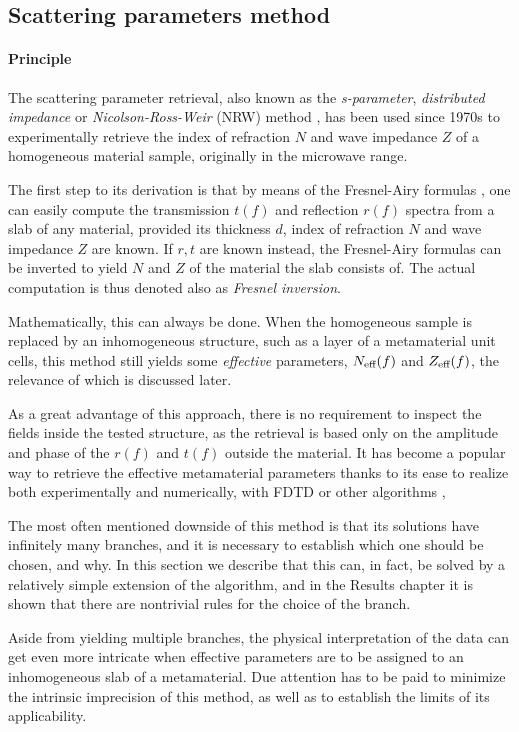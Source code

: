 \subsection{Scattering parameters method}
\label{chapter_sparam}
\paragraph{Principle} %
The scattering parameter retrieval, also known as the \textit{s-parameter}, \textit{distributed impedance} or \textit{Nicolson-Ross-Weir} (NRW) method \cite{nicolson1970measurement, weir1974automatic}, has been used since 1970s to experimentally retrieve the index of refraction $N$ and wave impedance $Z$ of a homogeneous material sample, originally in the microwave range.

The first step to its derivation is that by means of the Fresnel-Airy formulas \cite[p. 329]{born1999book},
one can easily compute the transmission $t(f)$ and reflection $r(f)$ spectra from a slab of any material, provided its thickness $d$, index of refraction $N$ and wave impedance $Z$ are known.  If $r,t$ are known instead, the Fresnel-Airy formulas can be inverted to yield $N$ and $Z$ of the material the slab consists of. The actual computation is thus denoted also as \textit{Fresnel inversion}.

Mathematically, this can always be done. When the homogeneous sample is replaced by an inhomogeneous structure, such as a layer of a metamaterial unit cells, this method still yields some \textit{effective} parameters, $N_{\text{eff} }(f)$ and $Z_{\text{eff} }(f)$, the relevance of which is discussed later. 

As a great advantage of this approach, there is no requirement to inspect the fields inside the tested structure, as the retrieval is based only on the amplitude and phase of the  $r(f)$ and $t(f)$ outside the material. It has become a popular way to retrieve the effective metamaterial parameters thanks to its ease to realize both experimentally and numerically, with FDTD or other algorithms \cite{terao2011},

The most often mentioned downside of this method is that its solutions have infinitely many branches, and it is necessary to establish which one should be chosen, and why. In this section we describe that this can, in fact, be solved by a relatively simple extension of the algorithm, and in the Results chapter it is shown that there are nontrivial rules for the choice of the branch.

Aside from yielding multiple branches, the physical interpretation of the data can get even more intricate when effective parameters are to be assigned to an inhomogeneous slab of a metamaterial. Due attention has to be paid to minimize the intrinsic imprecision of this method, as well as to establish the limits of its applicability. 

